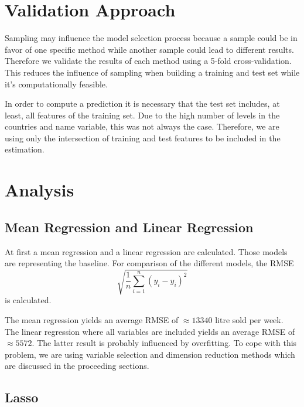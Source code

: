 \documentclass[11pt,]{article}
\begin{document}
\hypertarget{validation-approach}{%
\section{Validation Approach}\label{validation-approach}}

Sampling may influence the model selection process because a sample
could be in favor of one specific method while another sample could lead
to different results. Therefore we validate the results of each method
using a 5-fold cross-validation. This reduces the influence of sampling
when building a training and test set while it's computationally
feasible.

In order to compute a prediction it is necessary that the test set
includes, at least, all features of the training set. Due to the high
number of levels in the countries and name variable, this was not always
the case. Therefore, we are using only the intersection of training and
test features to be included in the estimation.

\hypertarget{analysis}{%
\section{Analysis}\label{analysis}}

\hypertarget{mean-regression-and-linear-regression}{%
\subsection{Mean Regression and Linear
Regression}\label{mean-regression-and-linear-regression}}

At first a mean regression and a linear regression are calculated. Those
models are representing the baseline. For comparison of the different
models, the \ac{RMSE}
\[\sqrt{\frac{1}{n}\sum_{i = 1}^{n}\left(y_i-\hat{y}_i\right)^2}\] is
calculated.

The mean regression yields an average \ac{RMSE} of \(\approx 13340\)
litre sold per week. The linear regression where all variables are
included yields an average \ac{RMSE} of \(\approx 5572\). The latter
result is probably influenced by overfitting. To cope with this problem,
we are using variable selection and dimension reduction methods which
are discussed in the proceeding sections.

\hypertarget{lasso}{%
\subsection{Lasso}\label{lasso}}
\end{document}
